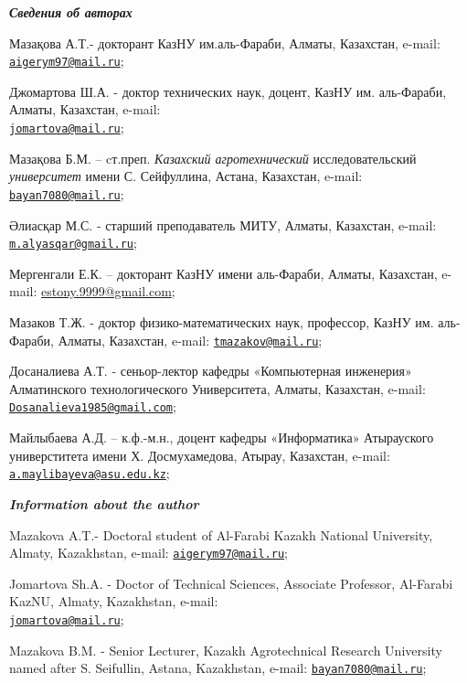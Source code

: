 \begin{authorinfo}
\emph{{\bfseries Сведения об авторах}}

Мазақова А.Т.- докторант КазНУ им.аль-Фараби, Алматы, Казахстан, e-mail:
\href{mailto:aigerym97@mail.ru}{\nolinkurl{aigerym97@mail.ru}};

Джомартова Ш.А. - доктор технических наук, доцент, КазНУ им. аль-Фараби,
Алматы, Казахстан, e-mail:\\
\href{mailto:jomartova@mail.ru}{\nolinkurl{jomartova@mail.ru}};

Мазақова Б.М. -- cт.преп. \emph{Казахский агротехнический}
исследовательский \emph{университет} имени С. Сейфуллина, Астана,
Казахстан, e-mail:
\href{mailto:bayan7080@mail.ru}{\nolinkurl{bayan7080@mail.ru}};

Әлиасқар М.С. - старший преподаватель МИТУ, Алматы, Казахстан, e-mail:
\href{mailto:m.alyasqar@gmail.ru}{\nolinkurl{m.alyasqar@gmail.ru}};

Мергенгали Е.К. -- докторант КазНУ имени аль-Фараби, Алматы, Казахстан,
e-mail: \href{https://e.mail.ru/compose/?mailto=mailto\%3aestony.9999@gmail.com}{estony.9999@gmail.com};

Мазаков Т.Ж. - доктор физико-математических наук, профессор, КазНУ им.
аль-Фараби, Алматы, Казахстан, e-mail:
\href{mailto:tmazakov@mail.ru}{\nolinkurl{tmazakov@mail.ru}};

Досаналиева А.Т. - сеньор-лектор кафедры «Компьютерная инженерия»
Алматинского технологического Университета, Алматы, Казахстан, e-mail:
\href{mailto:Dosanalieva1985@gmail.com}{\nolinkurl{Dosanalieva1985@gmail.com}};

Майлыбаева А.Д. -- к.ф.-м.н., доцент кафедры «Информатика» Атырауского
универститета имени Х. Досмухамедова, Атырау, Казахстан, e-mail:
\href{mailto:a.maylibayeva@asu.edu.kz}{\nolinkurl{a.maylibayeva@asu.edu.kz}};

\emph{{\bfseries Information about the author}}

Mazakova A.T.- Doctoral student of Al-Farabi Kazakh National University,
Almaty, Kazakhstan, e-mail:
\href{mailto:aigerym97@mail.ru}{\nolinkurl{aigerym97@mail.ru}};

Jomartova Sh.A. - Doctor of Technical Sciences, Associate Professor,
Al-Farabi KazNU, Almaty, Kazakhstan, e-mail:\\
\href{mailto:jomartova@mail.ru}{\nolinkurl{jomartova@mail.ru}};

Mazakova B.M. - Senior Lecturer, Kazakh Agrotechnical Research
University named after S. Seifullin, Astana, Kazakhstan, e-mail:
\href{mailto:bayan7080@mail.ru}{\nolinkurl{bayan7080@mail.ru}};


\end{authorinfo}
